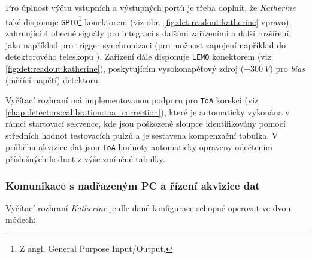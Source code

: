 Pro úplnost výčtu vstupních a výstupných portů je třeba doplnit, že \textit{Katherine} také disponuje \texttt{GPIO}\footnote{Z angl. General Purpose Input/Output.} konektorem (viz obr. \ref{fig:det:readout:katherine} vpravo), zahrnující 4 obecné signály pro integraci s dalšími zařízeními a další rozšíření, jako například pro trigger synchronizaci (pro možnost zapojení například do detektorového teleskopu \cite{katherine_telescope}). Zařízení dále disponuje \texttt{LEMO} konektorem (viz \ref{fig:det:readout:katherine}), poskytujícím vysokonapěťový zdroj ($\pm300~V$) pro \textit{bias} (měřící napětí) detektoru.

Vyčítací rozhraní má implementovanou podporu pro \texttt{ToA} korekci (viz \ref{chap:detectors:calibration:toa_correction}), které je automaticky vykonána v rámci startovací sekvence, kde jsou poškozené sloupce identifikovány pomocí středních hodnot testovacích pulzů a je sestavena kompenzační tabulka. V průběhu akvizice dat jsou \texttt{ToA} hodnoty automaticky opraveny odečtením příslušných hodnot z výše zmíněné tabulky.

\subsubsection{Komunikace s nadřazeným PC a řízení akvizice dat}\label{chap:detectors:readouts:katherine:comm}
Vyčítací rozhraní \textit{Katherine} je dle dané konfigurace schopné operovat ve dvou módech:

